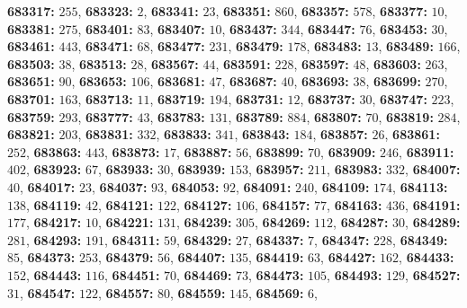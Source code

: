 \textsf{\bfseries 683317:} $255$, \textsf{\bfseries 683323:} $2$, \textsf{\bfseries 683341:} $23$, \textsf{\bfseries 683351:} $860$, \textsf{\bfseries 683357:} $578$, \textsf{\bfseries 683377:} $10$, \textsf{\bfseries 683381:} $275$, \textsf{\bfseries 683401:} $83$, \textsf{\bfseries 683407:} $10$, \textsf{\bfseries 683437:} $344$, \textsf{\bfseries 683447:} $76$, \textsf{\bfseries 683453:} $30$, \textsf{\bfseries 683461:} $443$, \textsf{\bfseries 683471:} $68$, \textsf{\bfseries 683477:} $231$, \textsf{\bfseries 683479:} $178$, \textsf{\bfseries 683483:} $13$, \textsf{\bfseries 683489:} $166$, \textsf{\bfseries 683503:} $38$, \textsf{\bfseries 683513:} $28$, \textsf{\bfseries 683567:} $44$, \textsf{\bfseries 683591:} $228$, \textsf{\bfseries 683597:} $48$, \textsf{\bfseries 683603:} $263$, \textsf{\bfseries 683651:} $90$, \textsf{\bfseries 683653:} $106$, \textsf{\bfseries 683681:} $47$, \textsf{\bfseries 683687:} $40$, \textsf{\bfseries 683693:} $38$, \textsf{\bfseries 683699:} $270$, \textsf{\bfseries 683701:} $163$, \textsf{\bfseries 683713:} $11$, \textsf{\bfseries 683719:} $194$, \textsf{\bfseries 683731:} $12$, \textsf{\bfseries 683737:} $30$, \textsf{\bfseries 683747:} $223$, \textsf{\bfseries 683759:} $293$, \textsf{\bfseries 683777:} $43$, \textsf{\bfseries 683783:} $131$, \textsf{\bfseries 683789:} $884$, \textsf{\bfseries 683807:} $70$, \textsf{\bfseries 683819:} $284$, \textsf{\bfseries 683821:} $203$, \textsf{\bfseries 683831:} $332$, \textsf{\bfseries 683833:} $341$, \textsf{\bfseries 683843:} $184$, \textsf{\bfseries 683857:} $26$, \textsf{\bfseries 683861:} $252$, \textsf{\bfseries 683863:} $443$, \textsf{\bfseries 683873:} $17$, \textsf{\bfseries 683887:} $56$, \textsf{\bfseries 683899:} $70$, \textsf{\bfseries 683909:} $246$, \textsf{\bfseries 683911:} $402$, \textsf{\bfseries 683923:} $67$, \textsf{\bfseries 683933:} $30$, \textsf{\bfseries 683939:} $153$, \textsf{\bfseries 683957:} $211$, \textsf{\bfseries 683983:} $332$, \textsf{\bfseries 684007:} $40$, \textsf{\bfseries 684017:} $23$, \textsf{\bfseries 684037:} $93$, \textsf{\bfseries 684053:} $92$, \textsf{\bfseries 684091:} $240$, \textsf{\bfseries 684109:} $174$, \textsf{\bfseries 684113:} $138$, \textsf{\bfseries 684119:} $42$, \textsf{\bfseries 684121:} $122$, \textsf{\bfseries 684127:} $106$, \textsf{\bfseries 684157:} $77$, \textsf{\bfseries 684163:} $436$, \textsf{\bfseries 684191:} $177$, \textsf{\bfseries 684217:} $10$, \textsf{\bfseries 684221:} $131$, \textsf{\bfseries 684239:} $305$, \textsf{\bfseries 684269:} $112$, \textsf{\bfseries 684287:} $30$, \textsf{\bfseries 684289:} $281$, \textsf{\bfseries 684293:} $191$, \textsf{\bfseries 684311:} $59$, \textsf{\bfseries 684329:} $27$, \textsf{\bfseries 684337:} $7$, \textsf{\bfseries 684347:} $228$, \textsf{\bfseries 684349:} $85$, \textsf{\bfseries 684373:} $253$, \textsf{\bfseries 684379:} $56$, \textsf{\bfseries 684407:} $135$, \textsf{\bfseries 684419:} $63$, \textsf{\bfseries 684427:} $162$, \textsf{\bfseries 684433:} $152$, \textsf{\bfseries 684443:} $116$, \textsf{\bfseries 684451:} $70$, \textsf{\bfseries 684469:} $73$, \textsf{\bfseries 684473:} $105$, \textsf{\bfseries 684493:} $129$, \textsf{\bfseries 684527:} $31$, \textsf{\bfseries 684547:} $122$, \textsf{\bfseries 684557:} $80$, \textsf{\bfseries 684559:} $145$, \textsf{\bfseries 684569:} $6$, 
